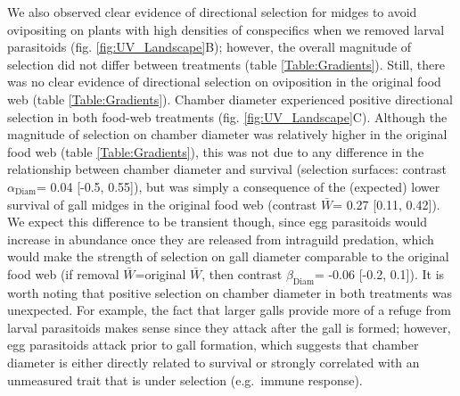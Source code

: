 \documentclass[11pt,]{article}
\begin{document}
We also observed clear evidence of directional selection for midges to
avoid ovipositing on plants with high densities of conspecifics when we
removed larval parasitoids (fig. \ref{fig:UV_Landscape}B); however, the
overall magnitude of selection did not differ between treatments (table
\ref{Table:Gradients}). Still, there was no clear evidence of
directional selection on oviposition in the original food web (table
\ref{Table:Gradients}). Chamber diameter experienced positive
directional selection in both food-web treatments (fig.
\ref{fig:UV_Landscape}C). Although the magnitude of selection on chamber
diameter was relatively higher in the original food web (table
\ref{Table:Gradients}), this was not due to any difference in the
relationship between chamber diameter and survival (selection surfaces:
contrast \(\alpha_{\text{Diam}}\)= 0.04 {[}-0.5, 0.55{]}), but was
simply a consequence of the (expected) lower survival of gall midges in
the original food web (contrast \(\bar W\)= 0.27 {[}0.11, 0.42{]}). We
expect this difference to be transient though, since egg parasitoids
would increase in abundance once they are released from intraguild
predation, which would make the strength of selection on gall diameter
comparable to the original food web (if removal \(\bar W\)=original
\(\bar W\), then contrast \(\beta_{\text{Diam}}\)= -0.06 {[}-0.2,
0.1{]}). It is worth noting that positive selection on chamber diameter
in both treatments was unexpected. For example, the fact that larger
galls provide more of a refuge from larval parasitoids makes sense since
they attack after the gall is formed; however, egg parasitoids attack
prior to gall formation, which suggests that chamber diameter is either
directly related to survival or strongly correlated with an unmeasured
trait that is under selection (e.g.~immune response).

\bigskip
\end{document}
